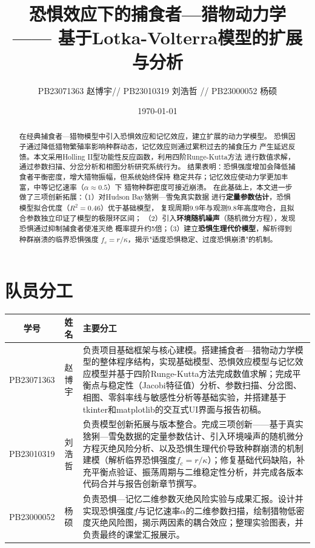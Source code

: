 \documentclass[UTF8]{ctexart}
\title{\textbf{恐惧效应下的捕食者—猎物动力学}\\ —— 基于Lotka-Volterra模型的扩展与分析}
\author{PB23071363 赵博宇// PB23010319 刘浩哲 // PB23000052 杨硕}
\date{\today}
\begin{document}
\maketitle

\section*{队员分工}

\begin{table}[H]
\centering
\begin{tabular}{c|c|p{8.5cm}}
\hline
\textbf{学号} & \textbf{姓名} & \textbf{主要分工} \\
\hline
PB23071363 & 赵博宇 & 负责项目基础框架与核心建模。搭建捕食者—猎物动力学模型的整体程序结构，实现基础模型、恐惧效应模型与记忆效应模型并基于四阶Runge-Kutta方法完成数值求解；完成平衡点与稳定性（Jacobi特征值）分析、参数扫描、分岔图、相图、零斜率线与敏感性分析等基础实验，并搭建基于tkinter和matplotlib的交互式UI界面与报告初稿。 \\
\hline
PB23010319 & 刘浩哲 & 负责模型创新拓展与版本整合。完成三项创新——基于真实猞猁—雪兔数据的定量参数估计、引入环境噪声的随机微分方程灭绝风险分析、以及恐惧生理代价导致种群崩溃的机制建模（解析临界恐惧强度$f_c=r/\kappa$）；修复基础代码缺陷，补充平衡点验证、振荡周期与二维稳定性分析，并完成各版本代码合并与报告创新章节撰写。 \\
\hline
PB23000052 & 杨硕 & 负责恐惧—记忆二维参数灭绝风险实验与成果汇报。设计并实现恐惧强度$f$与记忆速率$\alpha$的二维参数扫描，绘制猎物低密度灭绝风险图，揭示两因素的耦合效应；整理实验图表，并负责最终的课堂汇报展示。 \\
\hline
\end{tabular}
\end{table}

\begin{abstract}
在经典捕食者—猎物模型中引入恐惧效应和记忆效应，建立扩展的动力学模型。
恐惧因子通过降低猎物繁殖率影响种群动态，记忆效应则通过累积过去的捕食压力
产生延迟反馈。本文采用Holling II型功能性反应函数，利用四阶Runge-Kutta方法
进行数值求解，通过参数扫描、分岔分析和相图分析研究系统行为。
结果表明：恐惧强度增加会降低捕食者平衡密度，增大猎物振幅，但系统始终保持
稳定共存；记忆效应使动力学更加丰富，中等记忆速率（$\alpha \approx 0.5$）下
猎物种群密度可接近崩溃。
在此基础上，本文进一步做了三项创新拓展：（1）对Hudson Bay猞猁—雪兔真实数据
进行\textbf{定量参数估计}，恐惧模型拟合优度（$R^2=0.46$）优于基础模型，
复现周期$9.9$年与观测$9.8$年高度吻合，且拟合参数独立印证了模型的极限环区间；
（2）引入\textbf{环境随机噪声}（随机微分方程），发现恐惧通过抑制捕食者使准灭绝
概率提升约5倍；（3）建立\textbf{恐惧生理代价模型}，解析得到种群崩溃的临界恐惧强度
$f_c = r/\kappa$，揭示"适度恐惧稳定、过度恐惧崩溃"的机制。
\end{abstract}
\end{document}
